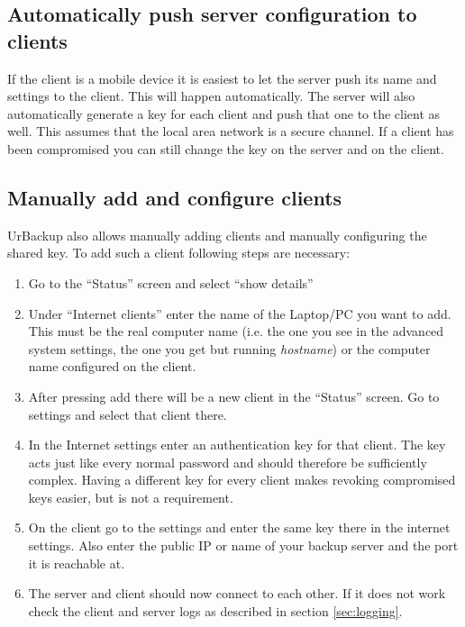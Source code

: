 \documentclass[a4paper,10pt]{article}
\begin{document}
\subsection{Automatically push server configuration to clients}

If the client is a mobile device it is easiest to let the server push its name and
settings to the client. This will happen automatically. The server will also automatically
generate a key for each client and push that one to the client as well. This assumes that
the local area network is a secure channel. If a client has been compromised you can still
change the key on the server and on the client.

\subsection{Manually add and configure clients}

UrBackup also allows manually adding clients and manually configuring the shared key. To
add such a client following steps are necessary:

\begin{enumerate}
  \item Go to the ``Status'' screen and select ``show details''
  \item Under ``Internet clients'' enter the name of the Laptop/PC you want to add. This
  must be the real computer name (i.e. the one you see in the advanced system settings, the
  one you get but running \textsl{hostname}) or the computer name configured on the client.
  \item After pressing add there will be a new client in the ``Status'' screen. Go to settings
  and select that client there.
  \item In the Internet settings enter an authentication key for that client. The key acts just like every
  normal password and should therefore be sufficiently complex. Having a different key for every
  client makes revoking compromised keys easier, but is not a requirement.
  \item On the client go to the settings and enter the same key there in the internet settings.
  Also enter the public IP or name of your backup server and the port it is reachable at.
  \item The server and client should now connect to each other. If it does not work check the
  client and server logs as described in section \ref{sec:logging}.
\end{enumerate}
\end{document}
